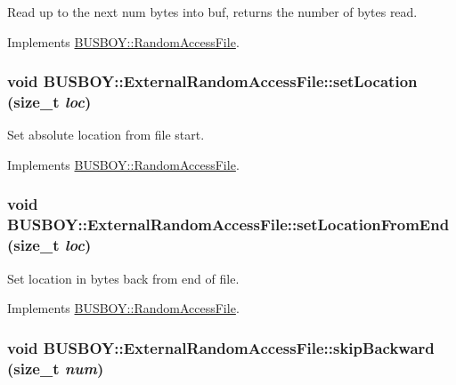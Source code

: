 Read up to the next num bytes into buf, returns the number of bytes read. 

Implements \hyperlink{classBUSBOY_1_1RandomAccessFile_ac8fa9aa05b321b980757a6d80f4eefae}{BUSBOY::RandomAccessFile}.\hypertarget{classBUSBOY_1_1ExternalRandomAccessFile_af7feababef4d36ab03b965f18928a6c2}{
\subsubsection[{setLocation}]{\setlength{\rightskip}{0pt plus 5cm}void BUSBOY::ExternalRandomAccessFile::setLocation (size\_\-t {\em loc})}}
\label{classBUSBOY_1_1ExternalRandomAccessFile_af7feababef4d36ab03b965f18928a6c2}


Set absolute location from file start. 

Implements \hyperlink{classBUSBOY_1_1RandomAccessFile_a8b6fdc1a27e34688d73d167bfa791c30}{BUSBOY::RandomAccessFile}.\hypertarget{classBUSBOY_1_1ExternalRandomAccessFile_a765ea63c90b6c129f489a92750125afd}{
\subsubsection[{setLocationFromEnd}]{\setlength{\rightskip}{0pt plus 5cm}void BUSBOY::ExternalRandomAccessFile::setLocationFromEnd (size\_\-t {\em loc})}}
\label{classBUSBOY_1_1ExternalRandomAccessFile_a765ea63c90b6c129f489a92750125afd}


Set location in bytes back from end of file. 

Implements \hyperlink{classBUSBOY_1_1RandomAccessFile_ae4a1cbc1c1ffc7405ef11bd9441c5f2b}{BUSBOY::RandomAccessFile}.\hypertarget{classBUSBOY_1_1ExternalRandomAccessFile_a276a851c64fd6de2ecc00d06ed1f2fed}{
\subsubsection[{skipBackward}]{\setlength{\rightskip}{0pt plus 5cm}void BUSBOY::ExternalRandomAccessFile::skipBackward (size\_\-t {\em num})}}
\label{classBUSBOY_1_1ExternalRandomAccessFile_a276a851c64fd6de2ecc00d06ed1f2fed}


